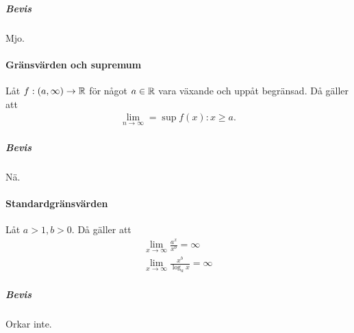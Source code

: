 \subparagraph{Bevis}
Mjo.

\paragraph{Gränsvärden och supremum}
Låt $f: (a, \infty)\to\mathbb{R}$ för något $a\in\mathbb{R}$ vara växande och uppåt begränsad. Då gäller att
\begin{align*}
	\lim\limits_{n\to\infty} = \sup{f(x): x\geq a}.
\end{align*}

\subparagraph{Bevis}
Nä.

\paragraph{Standardgränsvärden}
Låt $a > 1, b > 0$. Då gäller att
\begin{align*}
	\lim\limits_{x\to\infty}\frac{a^x}{x^b} = \infty \\
	\lim\limits_{x\to\infty}\frac{x^b}{\log_a x} = \infty
\end{align*}

\subparagraph{Bevis}
Orkar inte.